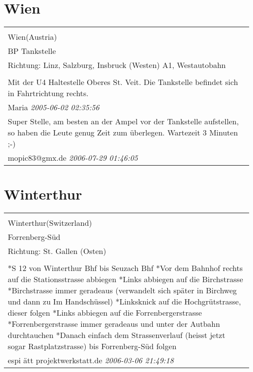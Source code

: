 \documentclass[a4paper,12pt]{article}
\begin{document}
\section{Wien}
\begin{tabular}{|p{13cm}|}
\hline\\
Wien(Austria)\\
BP Tankstelle\\
Richtung: Linz, Salzburg, Insbruck (Westen) A1, Westautobahn \\
\hline\\
Mit der U4 Haltestelle Oberes St. Veit. Die Tankstelle befindet sich in Fahrtrichtung rechts. \\
Maria \textit{ 2005-06-02 02:35:56 }\\\hline Super Stelle, am besten an der Ampel vor der Tankstelle aufstellen, so haben die Leute genug Zeit zum überlegen.
Wartezeit 3 Minuten ;-) \\
mopic83@gmx.de \textit{ 2006-07-29 01:46:05 }\\\hline
\end{tabular}


\section{Winterthur}
\begin{tabular}{|p{13cm}|}
\hline\\
Winterthur(Switzerland)\\
Forrenberg-Süd\\
Richtung: St. Gallen (Osten) \\
\hline\\
*S 12 von Winterthur Bhf bis Seuzach Bhf
*Vor dem Bahnhof rechts auf die Stationsstrasse abbiegen
*Links abbiegen auf die Birchstrasse
*Birchstrasse immer geradeaus (verwandelt sich später in Birchweg und dann zu Im Handschüssel)
*Linksknick auf die Hochgrütstrasse, dieser folgen
*Links abbiegen auf die Forrenbergerstrasse
*Forrenbergerstrasse immer geradeaus und unter der Autbahn durchtauchen
*Danach einfach dem Strassenverlauf (heisst jetzt sogar Rastplatzstrasse) bis Forrenberg-Süd folgen \\
espi ätt projektwerkstatt.de \textit{ 2006-03-06 21:49:18 }\\\hline
\end{tabular}
\end{document}
